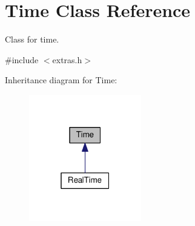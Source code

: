 \hypertarget{classTime}{}\section{Time Class Reference}
\label{classTime}


Class for time.  




{\ttfamily \#include $<$extras.\+h$>$}



Inheritance diagram for Time\+:
\nopagebreak
\begin{figure}[H]
\begin{center}
\leavevmode
\includegraphics[width=139pt]{classTime__inherit__graph}
\end{center}
\end{figure}
